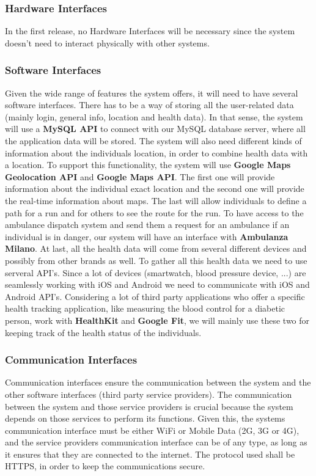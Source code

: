 \documentclass[12pt]{article}
\begin{document}
\subsubsection{Hardware Interfaces}
In the first release, no Hardware Interfaces will be necessary since the system doesn’t need to interact physically with other systems.
\subsubsection{Software Interfaces}
Given the wide range of features the system offers, it will need to have several software interfaces. There has to be a way of storing all the user-related data (mainly login, general info, location and health data). In that sense, the system will use a \textbf{MySQL API} to connect with our MySQL database server, where all the application data will be stored. The system will also need different kinds of information about the individuals location, in order to combine health data with a location. To support this functionality, the system will use \textbf{Google Maps Geolocation API} and \textbf{Google Maps API}. The first one will provide information about the individual exact location and the second one will provide the real-time information about maps. The last will allow individuals to define a path for a run and for others to see the route for the run. To have access to the ambulance dispatch system and send them a request for an ambulance if an individual is in danger, our system will have an interface with \textbf{Ambulanza Milano}. At last, all the health data will come from several different devices and possibly from other brands as well. To gather all this health data we need to use serveral API's. Since a lot of devices (smartwatch, blood pressure device, ...) are seamlessly working with iOS and Android we need to communicate with iOS and Android API's. Considering a lot of third party applications who offer a specific health tracking application, like measuring the blood control for a diabetic person, work with \textbf{HealthKit} and \textbf{Google Fit}, we will mainly use these two for keeping track of the health status of the individuals. 

\subsubsection{Communication Interfaces}
Communication interfaces ensure the communication between the system and the other software interfaces (third party service providers). The communication between the system and those service providers is crucial because the system depends on those services to perform its functions. Given this, the systems communication interface must be either WiFi or Mobile Data (2G, 3G or 4G), and the service providers communication interface can be of any type, as long as it ensures that they are connected to the internet. The protocol used shall be HTTPS, in order to keep the communications secure.
\end{document}
